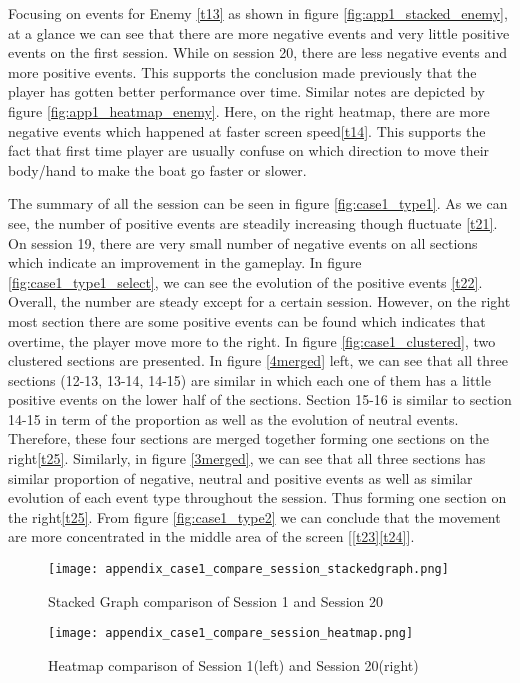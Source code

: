 Focusing on events for Enemy \ref{t13} as shown in figure \ref{fig:app1_stacked_enemy}, at a glance we can see that there are more negative events and very little positive events on the first session. While on session 20, there are less negative events and more positive events. This supports the conclusion made previously that the player has gotten better performance over time. Similar notes are depicted by figure \ref{fig:app1_heatmap_enemy}. Here, on the right heatmap, there are more negative events which happened at faster screen speed\ref{t14}. This supports the fact that first time player are usually confuse on which direction to move their body/hand to make the boat go faster or slower.

The summary of all the session can be seen in figure \ref{fig:case1_type1}. As we can see, the number of positive events are steadily increasing though fluctuate \ref{t21}. On session 19, there are very small number of negative events on all sections which indicate an improvement in the gameplay. In figure \ref{fig:case1_type1_select}, we can see the evolution of the positive events \ref{t22}. Overall, the number are steady except for a certain session. However, on the right most section there are some positive events can be found which indicates that overtime, the player move more to the right. In figure \ref{fig:case1_clustered}, two clustered sections are presented. In figure \ref{4merged} left, we can see that all three sections (12-13, 13-14, 14-15) are similar in which each one of them has a little positive events on the lower half of the sections. Section 15-16 is similar to section 14-15 in term of the proportion as well as the evolution of neutral events. Therefore, these four sections are merged together forming one sections on the right\ref{t25}. Similarly, in figure \ref{3merged}, we can see that all three sections has similar proportion of negative, neutral and positive events as well as similar evolution of each event type throughout the session. Thus forming one section on the right\ref{t25}. From figure \ref{fig:case1_type2} we can conclude that the movement are more concentrated in the middle area of the screen [\ref{t23}\ref{t24}].

\begin{figure}
\centering
\texttt{[image: appendix\_case1\_compare\_session\_stackedgraph.png]}
\caption{Stacked Graph comparison of Session 1 and Session 20}
\label{fig:app1_stacked}
\end{figure}

\begin{figure}
\centering
\texttt{[image: appendix\_case1\_compare\_session\_heatmap.png]}
\caption{Heatmap comparison of Session 1(left) and Session 20(right)}
\label{fig:app1_heatmap}
\end{figure}

